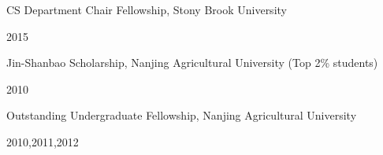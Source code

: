 


\begin{cvhonors}


\cvhonor
{
\begin{cvitems}
\item{CS Department Chair Fellowship, Stony Brook University}
\end{cvitems}
}
{2015}
\vspace{-2mm}
\cvhonor
{
\begin{cvitems}
\item{Jin-Shanbao Scholarship, Nanjing Agricultural University (Top 2\% students)}
\end{cvitems}
}
{2010}
\vspace{-2mm}
\cvhonor
{
\begin{cvitems}
\item{Outstanding Undergraduate Fellowship, Nanjing Agricultural University}
\end{cvitems}
}
{2010,2011,2012}

\end{cvhonors}

